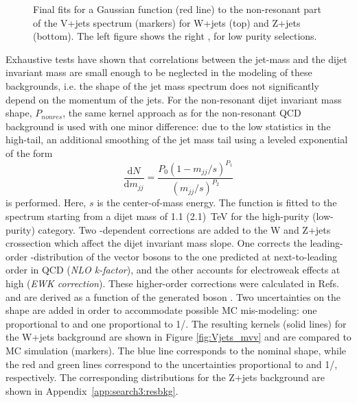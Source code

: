 \begin{figure}[h]
\caption{Final fits for a Gaussian function (red line) to the non-resonant part of the V+jets spectrum (markers) for W+jets (top) and Z+jets (bottom). The left figure shows \MJO the right \MJT, for low purity selections. }
\label{fig:Vjets_fits_nonRes}
\end{figure}
Exhaustive tests have shown that correlations between the jet-mass and the dijet invariant mass are small enough to be neglected in the modeling of these backgrounds, i.e. the shape of the jet mass spectrum does not significantly depend on the momentum of the jets. For the non-resonant dijet invariant mass shape, $P_{nonres}$, the same kernel approach as for the non-resonant QCD background is used with one minor difference: due to the low statistics in the high-\MVV tail, an additional smoothing of the jet mass tail using a leveled exponential of the form
\begin{equation}
\frac{\text{d} N}{\text{d} m_{jj}} = \frac{P_0 (1-m_{jj}/s)^{P_1}}{(m_{jj}/s)^{P_2}}
\end{equation}
is performed. Here, $s$ is the center-of-mass energy. The function is fitted to the spectrum starting from a dijet mass of 1.1 (2.1)~TeV for the high-purity (low-purity) category. Two \PT-dependent corrections are added to the W and Z+jets crossection which affect the dijet invariant mass slope. One corrects the leading-order \PT-distribution of the vector bosons to the one predicted at next-to-leading order in QCD (\emph{NLO k-factor}), and the other accounts for electroweak effects at high \PT (\emph{EWK correction}). These higher-order corrections were calculated in Refs.~\cite{Kallweit:2014xda,Kallweit:2015dum,Kallweit:2015fta} and are derived as a function of the generated boson \PT. Two uncertainties on the \MVV shape are added in order to accommodate possible MC mis-modeling: one proportional to \MVV and one proportional to 1/\MVV. The resulting \MVV kernels (solid lines) for the W+jets background are shown in Figure \ref{fig:Vjets_mvv} and are compared to MC simulation (markers). The blue line corresponds to the nominal shape, while the red and green lines correspond to the uncertainties proportional to \MVV and 1/\MVV, respectively. The corresponding distributions for the Z+jets background are shown in Appendix~\ref{app:search3:resbkg}.\par
